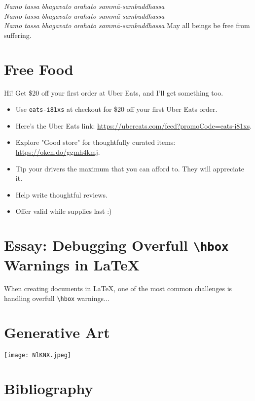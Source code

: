 \documentclass[12pt]{article}
\begin{document}
\thispagestyle{empty}
\begin{center}
    \textit{
    Namo tassa bhagavato arahato samm\=a-sambuddhassa\\
    Namo tassa bhagavato arahato samm\=a-sambuddhassa\\
    Namo tassa bhagavato arahato samm\=a-sambuddhassa
    }
    \vspace{2cm}
    May all beings be free from suffering.
\end{center}

\tableofcontents


\section*{Free Food}
\begin{center}
Hi! Get \$20 off your first order at Uber Eats, and I’ll get something too.

\begin{itemize}
    \item Use \texttt{eats-i81xs} at checkout for \$20 off your first Uber Eats order.
    \item Here’s the Uber Eats link: \url{https://ubereats.com/feed?promoCode=eats-i81xs}.
    \item Explore "Good store" for thoughtfully curated items: \url{https://oken.do/ggmh4kmj}.
    \item Tip your drivers the maximum that you can afford to. They will appreciate it.
    \item Help write thoughtful reviews.
    \item Offer valid while supplies last :)
\end{itemize}

\end{center}



\section*{Essay: Debugging Overfull \texttt{\textbackslash hbox} Warnings in LaTeX}

When creating documents in LaTeX, one of the most common challenges is handling overfull \texttt{\textbackslash hbox} warnings...


\section*{Generative Art}
\begin{center}
    \texttt{[image: NlKNX.jpeg]}\\
\end{center}




\section*{Bibliography}
\printbibliography
\end{document}
